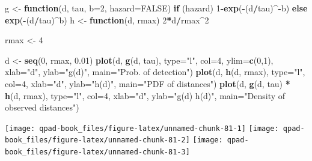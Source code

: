 \documentclass[12pt,]{book}
\newenvironment{Shaded}{\begin{snugshade}}{\end{snugshade}}
\newcommand{\ControlFlowTok}[1]{\textcolor[rgb]{0.13,0.29,0.53}{\textbf{#1}}}
\newcommand{\DataTypeTok}[1]{\textcolor[rgb]{0.13,0.29,0.53}{#1}}
\newcommand{\DecValTok}[1]{\textcolor[rgb]{0.00,0.00,0.81}{#1}}
\newcommand{\FloatTok}[1]{\textcolor[rgb]{0.00,0.00,0.81}{#1}}
\newcommand{\KeywordTok}[1]{\textcolor[rgb]{0.13,0.29,0.53}{\textbf{#1}}}
\newcommand{\NormalTok}[1]{#1}
\newcommand{\OperatorTok}[1]{\textcolor[rgb]{0.81,0.36,0.00}{\textbf{#1}}}
\newcommand{\OtherTok}[1]{\textcolor[rgb]{0.56,0.35,0.01}{#1}}
\newcommand{\StringTok}[1]{\textcolor[rgb]{0.31,0.60,0.02}{#1}}
\begin{document}
\begin{Shaded}
\begin{Highlighting}[]
\NormalTok{g <-}\StringTok{ }\ControlFlowTok{function}\NormalTok{(d, tau, }\DataTypeTok{b=}\DecValTok{2}\NormalTok{, }\DataTypeTok{hazard=}\OtherTok{FALSE}\NormalTok{)}
  \ControlFlowTok{if}\NormalTok{ (hazard)}
    \DecValTok{1}\OperatorTok{-}\KeywordTok{exp}\NormalTok{(}\OperatorTok{-}\NormalTok{(d}\OperatorTok{/}\NormalTok{tau)}\OperatorTok{^-}\NormalTok{b) }\ControlFlowTok{else} \KeywordTok{exp}\NormalTok{(}\OperatorTok{-}\NormalTok{(d}\OperatorTok{/}\NormalTok{tau)}\OperatorTok{^}\NormalTok{b)}
\NormalTok{h <-}\StringTok{ }\ControlFlowTok{function}\NormalTok{(d, rmax)}
  \DecValTok{2}\OperatorTok{*}\NormalTok{d}\OperatorTok{/}\NormalTok{rmax}\OperatorTok{^}\DecValTok{2}
\end{Highlighting}
\end{Shaded}

\begin{Shaded}
\begin{Highlighting}[]
\NormalTok{rmax <-}\StringTok{ }\DecValTok{4}

\NormalTok{d <-}\StringTok{ }\KeywordTok{seq}\NormalTok{(}\DecValTok{0}\NormalTok{, rmax, }\FloatTok{0.01}\NormalTok{)}
\KeywordTok{plot}\NormalTok{(d, }\KeywordTok{g}\NormalTok{(d, tau), }\DataTypeTok{type=}\StringTok{"l"}\NormalTok{, }\DataTypeTok{col=}\DecValTok{4}\NormalTok{, }\DataTypeTok{ylim=}\KeywordTok{c}\NormalTok{(}\DecValTok{0}\NormalTok{,}\DecValTok{1}\NormalTok{),}
  \DataTypeTok{xlab=}\StringTok{"d"}\NormalTok{, }\DataTypeTok{ylab=}\StringTok{"g(d)"}\NormalTok{, }\DataTypeTok{main=}\StringTok{"Prob. of detection"}\NormalTok{)}
\KeywordTok{plot}\NormalTok{(d, }\KeywordTok{h}\NormalTok{(d, rmax), }\DataTypeTok{type=}\StringTok{"l"}\NormalTok{, }\DataTypeTok{col=}\DecValTok{4}\NormalTok{,}
  \DataTypeTok{xlab=}\StringTok{"d"}\NormalTok{, }\DataTypeTok{ylab=}\StringTok{"h(d)"}\NormalTok{, }\DataTypeTok{main=}\StringTok{"PDF of distances"}\NormalTok{)}
\KeywordTok{plot}\NormalTok{(d, }\KeywordTok{g}\NormalTok{(d, tau) }\OperatorTok{*}\StringTok{ }\KeywordTok{h}\NormalTok{(d, rmax), }\DataTypeTok{type=}\StringTok{"l"}\NormalTok{, }\DataTypeTok{col=}\DecValTok{4}\NormalTok{,}
  \DataTypeTok{xlab=}\StringTok{"d"}\NormalTok{, }\DataTypeTok{ylab=}\StringTok{"g(d) h(d)"}\NormalTok{, }\DataTypeTok{main=}\StringTok{"Density of observed distances"}\NormalTok{)}
\end{Highlighting}
\end{Shaded}

\texttt{[image: qpad-book\_files/figure-latex/unnamed-chunk-81-1]} \texttt{[image: qpad-book\_files/figure-latex/unnamed-chunk-81-2]} \texttt{[image: qpad-book\_files/figure-latex/unnamed-chunk-81-3]}
\end{document}

